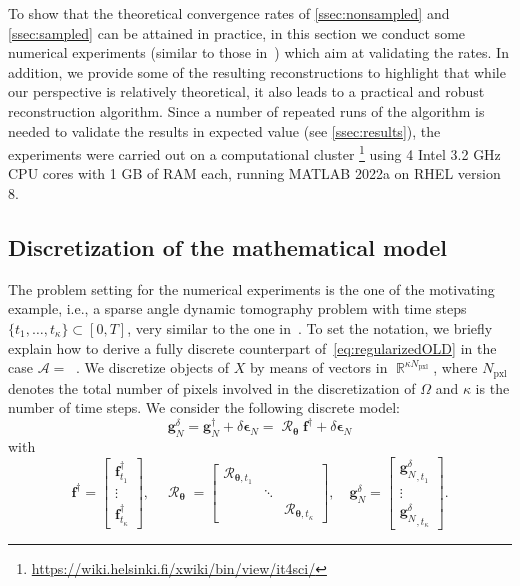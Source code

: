 \documentclass[11pt,a4paper]{article}
\numberwithin{equation}{section}
\DeclareMathOperator{\R}{\mathbb{R}}
\DeclareMathOperator{\RadonD}{\vec{\mathcal{R}}}
\DeclareMathOperator{\cradonSD}{\mathscr{R}^{\text{sd}}}
\newcommand{\Npxl}{N_{\text{pxl}}}
\renewcommand{\vec}[1]{\boldsymbol{#1}} %
\newcommand{\f}{\vec{f}} %
\newcommand{\g}{\vec{g}} %
\newcommand{\thetab}{\vec{\theta}} %
\newcommand{\gNd}{{\g_{N}^{\delta}}} %
\newcommand{\cA}{\mathscr{A}}
\begin{document}
To show that the theoretical convergence rates of \cref{ssec:nonsampled} and \cref{ssec:sampled} can be attained in practice, in this section we conduct some numerical experiments (similar to those in~\cite{Bubba22}) which aim at validating the rates. In addition, we provide some of the resulting reconstructions to highlight that while our perspective is relatively theoretical, it also leads to a practical and robust  reconstruction algorithm. 
Since a number of repeated runs of the algorithm is needed to validate the results in expected value (see \cref{ssec:results}), the experiments were carried out on a computational cluster%
\footnote{\url{https://wiki.helsinki.fi/xwiki/bin/view/it4sci/}} %
 using 4 Intel 3.2 GHz CPU cores with 1 GB of RAM each, running MATLAB 2022a on RHEL version 8.

\subsection{Discretization of the mathematical model}
\label{ssec:MathsMod}
The problem setting for the numerical experiments is the one of the motivating example, i.e., a sparse angle dynamic tomography problem with time steps $\{t_1, \ldots, t_\kappa \} \subset [0,T]$, very similar to the one in~\cite{Bubba20, bubba2023efficient}. To set the notation, we briefly explain how to derive a fully discrete counterpart of~\eqref{eq:regularizedOLD} in the case $\cA = \cradonSD$. We discretize objects of $X$ by means of vectors in $\R^{\kappa \Npxl}$, where $\Npxl$ denotes the total number of pixels involved in the discretization of $\Omega$  and $\kappa$ is the number of time steps.
We consider the following discrete model:
\begin{equation}
\gNd = \g_N^\dag + \delta \vec{\epsilon}_N = \RadonD_{\thetab} \f^\dag + \delta \vec{\epsilon}_N
\label{eq:DiscrRadonSampl}
\end{equation}
with 
\begin{equation*}
    \f^\dag = \left[ \begin{array}{c}
    \f_{t_1}^\dag \\
    \vdots \\
    \f_{t_\kappa}^\dag \end{array} \right], \quad \RadonD_{\thetab} = \left[ \begin{array}{ccc}
    \RadonD_{\thetab,t_1} & & \\
     & \ddots & \\
     & & \RadonD_{\thetab,t_\kappa} \end{array} \right], \quad \gNd = \left[ \begin{array}{c}
    \gNd_{,t_1} \\
    \vdots \\
    \gNd_{,t_\kappa} \end{array} \right].
\end{equation*}
\end{document}
